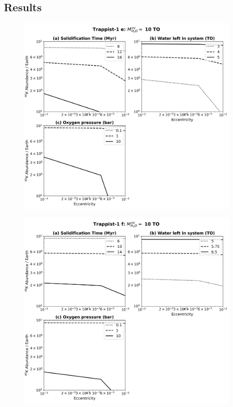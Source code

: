 \documentclass[abstract=on, letterpaper]{scrartcl}
\numberwithin{equation}{section}
\begin{document}
\subsection{Results}

\begin{figure}[H]
	\includegraphics[width=\textwidth]{../Fig_Trappist1e_ContourPlot/Trappist-1_e_10TO_CountourPlot}
	\caption{}
	\label{TR1e-Contour}
\end{figure}

\begin{figure}[H]
	\includegraphics[width=\textwidth]{../Fig_Trappist1f_ContourPlot/Trappist-1_f_10TO_CountourPlot}
	\caption{}
	\label{TR1f-Contour}
\end{figure}
\end{document}
